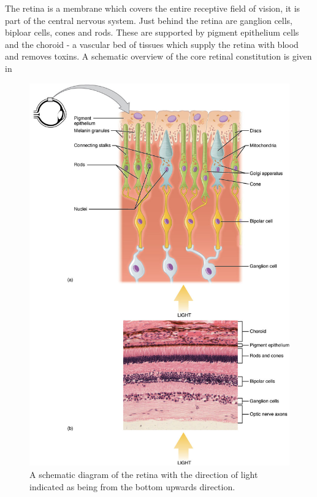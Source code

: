 The retina is a membrane which covers the entire receptive field of
vision, it is part of the central nervous system.\cite{rogers1983neurite}
Just behind the retina are ganglion cells, biploar cells, cones and rods.
These are supported by pigment epithelium cells and the choroid - a
vascular bed of tissues which supply the retina with blood and removes
toxins. \cite{lutty1996localization} A schematic overview of the core
retinal constitution is given in 

\begin{figure}[htbp]
\centering
  \includegraphics{figures/rods_and_cones}
\caption{A schematic diagram of the retina with the direction of light indicated
as being from the bottom upwards direction.}
\label{fig:retina}
\end{figure}

